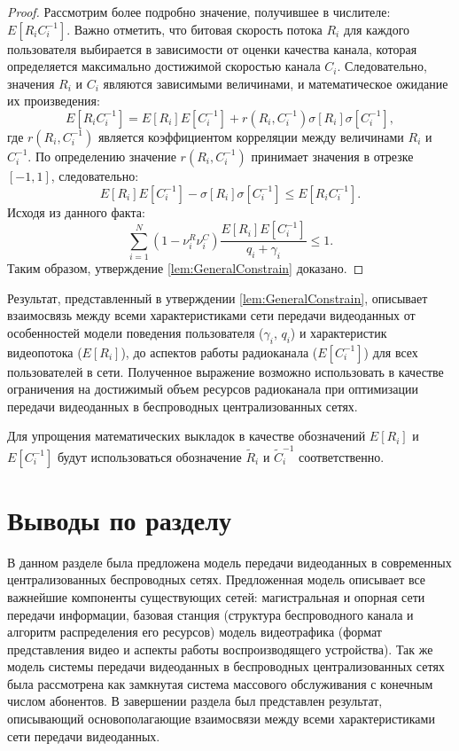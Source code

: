 \begin{proof}
Рассмотрим более подробно значение, получившее в числителе: $E\left[R_{i}C_{i}^{-1}\right]$. Важно отметить, что битовая скорость потока $R_i$ для каждого пользователя выбирается в зависимости от оценки качества канала, которая определяется максимально достижимой скоростью канала $C_i$. Следовательно, значения $R_i$ и $C_i$ являются зависимыми величинами, и математическое ожидание их произведения:
\begin{equation}
	\nonumber
	E\left[R_{i}C_{i}^{-1}\right] = E\left[R_{i}\right]E\left[C_{i}^{-1}\right] + r \left(R_i, C_{i}^{-1}\right) \sigma[R_i]\sigma[C_i^{-1}],
\end{equation}
где $r \left(R_i, C_{i}^{-1}\right)$ является коэффициентом корреляции между величинами $R_i$ и $C_{i}^{-1}$. По определению значение $r \left(R_i, C_{i}^{-1}\right)$ принимает значения в отрезке $[-1, 1]$, следовательно:
\begin{equation}
	\nonumber
	 E\left[R_{i}\right]E\left[C_{i}^{-1}\right] - \sigma[R_i]\sigma[C_i^{-1}] \leq E\left[R_{i}C_{i}^{-1}\right].
\end{equation}
Исходя из данного факта:
\begin{equation}
	\nonumber
	\sum\limits_{i=1}^{N} {\left(1-\nu^R_i\nu^C_i\right)\frac{E[R_i]E[C_i^{-1}]}{q_i + \gamma_i}} \leq 1.
\end{equation}
Таким образом, утверждение \ref{lem:GeneralConstrain} доказано.
\end{proof}

Результат, представленный в утверждении \ref{lem:GeneralConstrain}, описывает взаимосвязь между всеми характеристиками сети передачи видеоданных от особенностей модели поведения пользователя ($\gamma_i$, $q_i$) и характеристик видеопотока ($E[R_i]$), до аспектов работы радиоканала ($E[C_i^{-1}]$) для всех пользователей в сети. Полученное выражение возможно использовать в качестве ограничения на достижимый объем ресурсов радиоканала при оптимизации передачи видеоданных в беспроводных централизованных сетях.

Для упрощения математических выкладок в качестве обозначений $E[R_i]$ и $E[C^{-1}_i]$ будут использоваться обозначение $\tilde{R}_i$ и $\tilde{C}^{-1}_i$ соответственно.

\section{Выводы по разделу}

В данном разделе была предложена модель передачи видеоданных в современных централизованных беспроводных сетях. Предложенная модель описывает все важнейшие компоненты существующих сетей: магистральная и опорная сети передачи информации, базовая станция (структура беспроводного канала и алгоритм распределения его ресурсов) модель видеотрафика (формат представления видео и аспекты работы воспроизводящего устройства). Так же модель системы передачи видеоданных в беспроводных централизованных сетях была рассмотрена как замкнутая система массового обслуживания с конечным числом абонентов. В завершении раздела был представлен результат, описывающий основополагающие взаимосвязи между всеми характеристиками сети передачи видеоданных.

